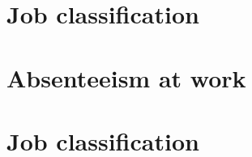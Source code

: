 \documentclass[12pt, krantz2,]{krantz}
\begin{document}
\hypertarget{job-classification-1}{%
\section{Job classification}\label{job-classification-1}}

\hypertarget{absenteeism-at-work}{%
\section{Absenteeism at work}\label{absenteeism-at-work}}

\hypertarget{job-classification-2}{%
\section{Job classification}\label{job-classification-2}}



\backmatter
\printindex
\end{document}
